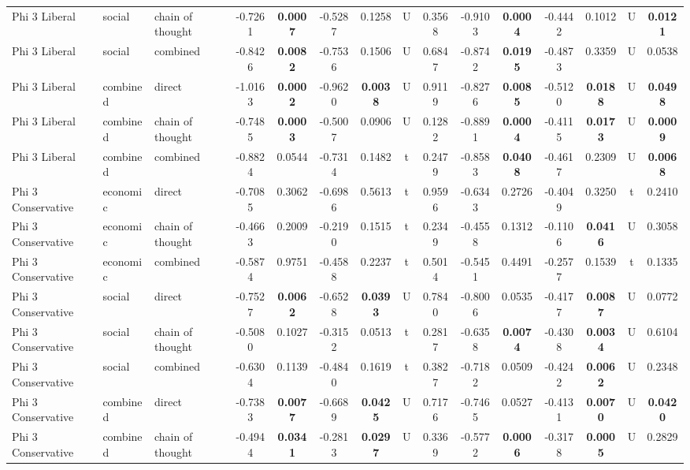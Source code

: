 \begin{center}
\begin{longtable}{@{}lll|cccccc|cccccc@{}}
        Phi 3 Liberal & social & chain of thought & -0.7261 & \textbf{0.0007} & -0.5287 & 0.1258 & U & 0.3568 & -0.9103 & \textbf{0.0004} & -0.4442 & 0.1012 & U & \textbf{0.0121} \\
        Phi 3 Liberal & social & combined & -0.8426 & \textbf{0.0082} & -0.7536 & 0.1506 & U & 0.6847 & -0.8742 & \textbf{0.0195} & -0.4873 & 0.3359 & U & 0.0538 \\
        Phi 3 Liberal & combined & direct & -1.0163 & \textbf{0.0002} & -0.9620 & \textbf{0.0038} & U & 0.9119 & -0.8276 & \textbf{0.0085} & -0.5120 & \textbf{0.0188} & U & \textbf{0.0498} \\
        Phi 3 Liberal & combined & chain of thought & -0.7485 & \textbf{0.0003} & -0.5007 & 0.0906 & U & 0.1282 & -0.8891 & \textbf{0.0004} & -0.4115 & \textbf{0.0173} & U & \textbf{0.0009} \\
        \rowcolor{gray!20} Phi 3 Liberal & combined & combined & -0.8824 & 0.0544 & -0.7314 & 0.1482 & t & 0.2479 & -0.8583 & \textbf{0.0408} & -0.4617 & 0.2309 & U & \textbf{0.0068} \\
        Phi 3 Conservative & economic & direct & -0.7085 & 0.3062 & -0.6986 & 0.5613 & t & 0.9596 & -0.6343 & 0.2726 & -0.4049 & 0.3250 & t & 0.2410 \\
        Phi 3 Conservative & economic & chain of thought & -0.4663 & 0.2009 & -0.2190 & 0.1515 & t & 0.2349 & -0.4558 & 0.1312 & -0.1106 & \textbf{0.0416} & U & 0.3058 \\
        Phi 3 Conservative & economic & combined & -0.5874 & 0.9751 & -0.4588 & 0.2237 & t & 0.5014 & -0.5451 & 0.4491 & -0.2577 & 0.1539 & t & 0.1335 \\
        Phi 3 Conservative & social & direct & -0.7527 & \textbf{0.0062} & -0.6528 & \textbf{0.0393} & U & 0.7840 & -0.8006 & 0.0535 & -0.4177 & \textbf{0.0087} & U & 0.0772 \\
        Phi 3 Conservative & social & chain of thought & -0.5080 & 0.1027 & -0.3152 & 0.0513 & t & 0.2817 & -0.6358 & \textbf{0.0074} & -0.4308 & \textbf{0.0034} & U & 0.6104 \\
        Phi 3 Conservative & social & combined & -0.6304 & 0.1139 & -0.4840 & 0.1619 & t & 0.3827 & -0.7182 & 0.0509 & -0.4242 & \textbf{0.0062} & U & 0.2348 \\
        Phi 3 Conservative & combined & direct & -0.7383 & \textbf{0.0077} & -0.6689 & \textbf{0.0425} & U & 0.7176 & -0.7465 & 0.0527 & -0.4131 & \textbf{0.0070} & U & \textbf{0.0420} \\
        Phi 3 Conservative & combined & chain of thought & -0.4944 & \textbf{0.0341} & -0.2813 & \textbf{0.0297} & U & 0.3369 & -0.5772 & \textbf{0.0006} & -0.3178 & \textbf{0.0005} & U & 0.2829 \\

\end{longtable}
\end{center}
